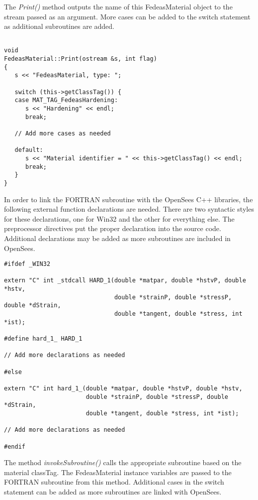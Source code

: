 \documentclass[12pt]{article}
\begin{document}
\noindent The {\em Print()} method outputs the name of this FedeasMaterial object to
the stream passed as an argument. More cases can be added to
the switch statement as additional subroutines are added.
    
{\sf\small
\begin{verbatim}

void
FedeasMaterial::Print(ostream &s, int flag)
{
   s << "FedeasMaterial, type: ";
           
   switch (this->getClassTag()) {
   case MAT_TAG_FedeasHardening:
      s << "Hardening" << endl;
      break;

   // Add more cases as needed
       
   default:
      s << "Material identifier = " << this->getClassTag() << endl;
      break;
   }
}
\end{verbatim}
}

\noindent In order to link the FORTRAN subroutine with the OpenSees C++ libraries, the
following external function declarations are needed. There are two syntactic styles for
these declarations, one for Win32 and the other for everything else. The preprocessor directives
put the proper declaration into the source code. Additional declarations may be added
as more subroutines are included in OpenSees.

{\sf\small
\begin{verbatim}
#ifdef _WIN32

extern "C" int _stdcall HARD_1(double *matpar, double *hstvP, double *hstv,
                               double *strainP, double *stressP, double *dStrain,
                               double *tangent, double *stress, int *ist);

#define hard_1_ HARD_1

// Add more declarations as needed

#else

extern "C" int hard_1_(double *matpar, double *hstvP, double *hstv,
                       double *strainP, double *stressP, double *dStrain,
                       double *tangent, double *stress, int *ist);

// Add more declarations as needed

#endif
\end{verbatim}
}

\noindent The method {\em invokeSubroutine()} calls the appropriate subroutine based
on the material classTag. The FedeasMaterial instance variables are passed to the
FORTRAN subroutine from this method. Additional cases in the switch statement can
be added as more subroutines are linked with OpenSees.
\end{document}
